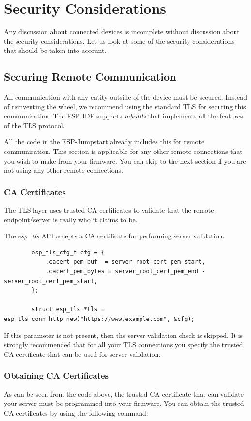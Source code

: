 \documentclass[main.tex]{subfiles}
\begin{document}
\chapter{Security Considerations}

Any discussion about connected devices is incomplete without discussion about the security considerations. Let us look at some of the security considerations that should be taken into account.

\section{Securing Remote Communication}
All communication with any entity outside of the device must be secured. Instead of reinventing the wheel, we recommend using the standard TLS for securing this communication. The ESP-IDF supports \textit{mbedtls} that implements all the features of the TLS protocol.

All the code in the ESP-Jumpstart already includes this for remote communication. This section is applicable for any other remote connections that you wish to make from your firmware. You can skip to the next section if you are not using any other remote connections.

\subsection{CA Certificates}
The TLS layer uses trusted CA certificates to validate that the remote endpoint/server is really who it claims to be.

The \textit{esp\_tls} API accepts a CA certificate for performing server validation.

\begin{verbatim}
        esp_tls_cfg_t cfg = {
            .cacert_pem_buf  = server_root_cert_pem_start,
            .cacert_pem_bytes = server_root_cert_pem_end - server_root_cert_pem_start,
        };

        struct esp_tls *tls = esp_tls_conn_http_new("https://www.example.com", &cfg);
\end{verbatim}

If this parameter is not present, then the server validation check is skipped. It is strongly recommended that for all your TLS connections you specify the trusted CA certificate that can be used for server validation.

\subsection{Obtaining CA Certificates}
As can be seen from the code above, the trusted CA certificate that can validate your server must be programmed into your firmware. You can obtain the trusted CA certificates by using the following command:
\end{document}
